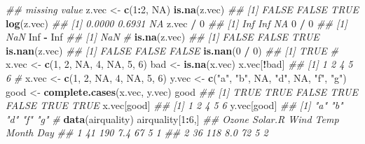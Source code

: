 \documentclass[
]{book}
\newenvironment{Shaded}{\begin{snugshade}}{\end{snugshade}}
\newcommand{\CommentTok}[1]{\textcolor[rgb]{0.56,0.35,0.01}{\textit{#1}}}
\newcommand{\DecValTok}[1]{\textcolor[rgb]{0.00,0.00,0.81}{#1}}
\newcommand{\KeywordTok}[1]{\textcolor[rgb]{0.13,0.29,0.53}{\textbf{#1}}}
\newcommand{\NormalTok}[1]{#1}
\newcommand{\OperatorTok}[1]{\textcolor[rgb]{0.81,0.36,0.00}{\textbf{#1}}}
\newcommand{\OtherTok}[1]{\textcolor[rgb]{0.56,0.35,0.01}{#1}}
\newcommand{\StringTok}[1]{\textcolor[rgb]{0.31,0.60,0.02}{#1}}
\begin{document}
\begin{Shaded}
\begin{Highlighting}[]
\CommentTok{\#\# missing value}
\NormalTok{z.vec \textless{}{-}}\StringTok{ }\KeywordTok{c}\NormalTok{(}\DecValTok{1}\OperatorTok{:}\DecValTok{2}\NormalTok{, }\OtherTok{NA}\NormalTok{)}
\KeywordTok{is.na}\NormalTok{(z.vec)}
\CommentTok{\#\# [1] FALSE FALSE  TRUE}
\KeywordTok{log}\NormalTok{(z.vec)}
\CommentTok{\#\# [1] 0.0000 0.6931     NA}
\NormalTok{z.vec }\OperatorTok{/}\StringTok{ }\DecValTok{0}
\CommentTok{\#\# [1] Inf Inf  NA}
\DecValTok{0} \OperatorTok{/}\StringTok{ }\DecValTok{0}
\CommentTok{\#\# [1] NaN}
\OtherTok{Inf} \OperatorTok{{-}}\StringTok{ }\OtherTok{Inf}
\CommentTok{\#\# [1] NaN}
\CommentTok{\#}
\KeywordTok{is.na}\NormalTok{(z.vec)}
\CommentTok{\#\# [1] FALSE FALSE  TRUE}
\KeywordTok{is.nan}\NormalTok{(z.vec)}
\CommentTok{\#\# [1] FALSE FALSE FALSE}
\KeywordTok{is.nan}\NormalTok{(}\DecValTok{0} \OperatorTok{/}\StringTok{ }\DecValTok{0}\NormalTok{)}
\CommentTok{\#\# [1] TRUE}
\CommentTok{\#}
\NormalTok{x.vec  \textless{}{-}}\StringTok{  }\KeywordTok{c}\NormalTok{(}\DecValTok{1}\NormalTok{, }\DecValTok{2}\NormalTok{, }\OtherTok{NA}\NormalTok{, }\DecValTok{4}\NormalTok{, }\OtherTok{NA}\NormalTok{, }\DecValTok{5}\NormalTok{, }\DecValTok{6}\NormalTok{)}
\NormalTok{bad  \textless{}{-}}\StringTok{  }\KeywordTok{is.na}\NormalTok{(x.vec)}
\NormalTok{x.vec[}\OperatorTok{!}\NormalTok{bad]}
\CommentTok{\#\# [1] 1 2 4 5 6}
\CommentTok{\#}
\NormalTok{x.vec  \textless{}{-}}\StringTok{  }\KeywordTok{c}\NormalTok{(}\DecValTok{1}\NormalTok{, }\DecValTok{2}\NormalTok{, }\OtherTok{NA}\NormalTok{, }\DecValTok{4}\NormalTok{, }\OtherTok{NA}\NormalTok{, }\DecValTok{5}\NormalTok{, }\DecValTok{6}\NormalTok{)}
\NormalTok{y.vec  \textless{}{-}}\StringTok{  }\KeywordTok{c}\NormalTok{(}\StringTok{"a"}\NormalTok{, }\StringTok{"b"}\NormalTok{, }\OtherTok{NA}\NormalTok{, }\StringTok{"d"}\NormalTok{, }\OtherTok{NA}\NormalTok{, }\StringTok{"f"}\NormalTok{, }\StringTok{"g"}\NormalTok{)}
\NormalTok{good  \textless{}{-}}\StringTok{  }\KeywordTok{complete.cases}\NormalTok{(x.vec, y.vec)}
\NormalTok{good}
\CommentTok{\#\# [1]  TRUE  TRUE FALSE  TRUE FALSE  TRUE  TRUE}
\NormalTok{x.vec[good]}
\CommentTok{\#\# [1] 1 2 4 5 6}
\NormalTok{y.vec[good]}
\CommentTok{\#\# [1] "a" "b" "d" "f" "g"}
\CommentTok{\#}
\KeywordTok{data}\NormalTok{(airquality)}
\NormalTok{airquality[}\DecValTok{1}\OperatorTok{:}\DecValTok{6}\NormalTok{,]}
\CommentTok{\#\#   Ozone Solar.R Wind Temp Month Day}
\CommentTok{\#\# 1    41     190  7.4   67     5   1}
\CommentTok{\#\# 2    36     118  8.0   72     5   2}

\end{Highlighting}
\end{Shaded}
\end{document}
